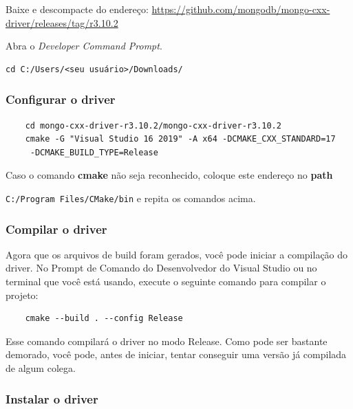 \documentclass[a4paper,11pt]{article}
\begin{document}
Baixe e descompacte do endereço: \url{https://github.com/mongodb/mongo-cxx-driver/releases/tag/r3.10.2}

Abra o \textit{Developer Command Prompt}.
\begin{mdframed}
\begin{verbatim}
cd C:/Users/<seu usuário>/Downloads/
\end{verbatim}
\end{mdframed}

\subsubsection{Configurar o driver}

\begin{mdframed}
	\begin{verbatim}
	cd mongo-cxx-driver-r3.10.2/mongo-cxx-driver-r3.10.2
	cmake -G "Visual Studio 16 2019" -A x64 -DCMAKE_CXX_STANDARD=17
	 -DCMAKE_BUILD_TYPE=Release
	\end{verbatim}
\end{mdframed}

Caso o comando \textbf{cmake} não seja reconhecido, coloque este endereço no \textbf{path}

{\tt C:/Program Files/CMake/bin} e repita os comandos acima.

\subsubsection{Compilar o driver}

Agora que os arquivos de build foram gerados, você pode iniciar a compilação do driver. No Prompt de Comando do Desenvolvedor do Visual Studio ou no terminal que você está usando, execute o seguinte comando para compilar o projeto:

\begin{mdframed}
	\begin{verbatim}
	cmake --build . --config Release
	\end{verbatim}
\end{mdframed}

Esse comando compilará o driver no modo Release. Como pode ser bastante demorado, você pode, antes de iniciar, tentar conseguir uma versão já compilada de algum colega.

\subsubsection{Instalar o driver}
\end{document}

